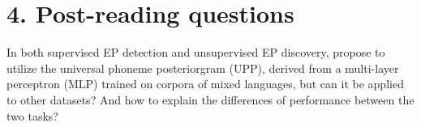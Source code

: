 \documentclass[nobib]{tufte-handout}
\begin{document}
\bigskip
\section{4. \textbf{Post-reading questions}}
In both supervised EP detection and unsupervised EP discovery, \cite{wang2015supervised} propose to utilize the universal phoneme posteriorgram (UPP), derived from a multi-layer perceptron (MLP) trained on corpora of mixed languages, but can it be applied to other datasets? And how to explain the differences of performance between the  two tasks?






\end{document}
